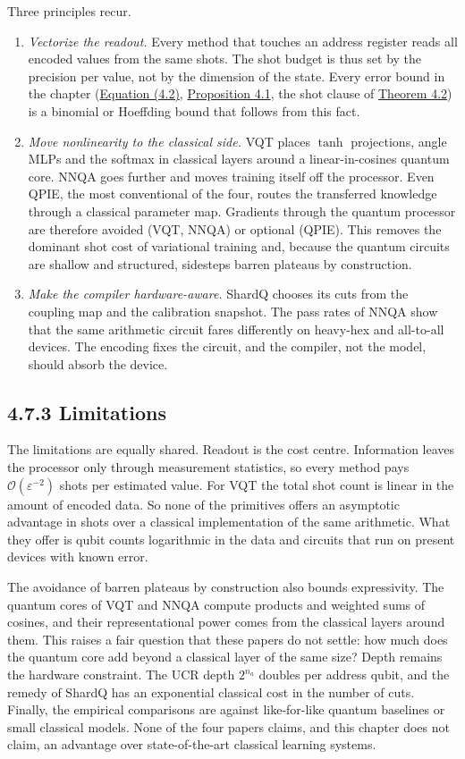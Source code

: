 \documentclass{report}
\theoremstyle{plain}
\theoremstyle{definition}
\theoremstyle{remark}
\newcommand{\bigO}[1]{\mathcal{O}\!\left(#1\right)}
\newcommand{\eps}{\varepsilon}
\begin{document}
Three principles recur.
\begin{enumerate}
\item \emph{Vectorize the readout.} Every method that touches an address register reads all encoded values from the same shots. The shot budget is thus set by the precision per value, not by the dimension of the state. Every error bound in the chapter (\hyperref[eq:qml:readout]{Equation (4.2)}, \hyperref[thm:qml:vqdp-variance]{Proposition 4.1}, the shot clause of \hyperref[thm:qml:nnqa-ua]{Theorem 4.2}) is a binomial or Hoeffding bound that follows from this fact.
\item \emph{Move nonlinearity to the classical side.} VQT places $\tanh$ projections, angle MLPs and the softmax in classical layers around a linear-in-cosines quantum core. NNQA goes further and moves training itself off the processor. Even QPIE, the most conventional of the four, routes the transferred knowledge through a classical parameter map. Gradients through the quantum processor are therefore avoided (VQT, NNQA) or optional (QPIE). This removes the dominant shot cost of variational training and, because the quantum circuits are shallow and structured, sidesteps barren plateaus by construction.
\item \emph{Make the compiler hardware-aware.} ShardQ chooses its cuts from the coupling map and the calibration snapshot. The pass rates of NNQA show that the same arithmetic circuit fares differently on heavy-hex and all-to-all devices. The encoding fixes the circuit, and the compiler, not the model, should absorb the device.
\end{enumerate}

\subsection{4.7.3 Limitations}\label{sec:qml:synthesis:limitations}

The limitations are equally shared. Readout is the cost centre. Information leaves the processor only through measurement statistics, so every method pays $\bigO{\eps^{-2}}$ shots per estimated value. For VQT the total shot count is linear in the amount of encoded data. So none of the primitives offers an asymptotic advantage in shots over a classical implementation of the same arithmetic. What they offer is qubit counts logarithmic in the data and circuits that run on present devices with known error.

The avoidance of barren plateaus by construction also bounds expressivity. The quantum cores of VQT and NNQA compute products and weighted sums of cosines, and their representational power comes from the classical layers around them. This raises a fair question that these papers do not settle: how much does the quantum core add beyond a classical layer of the same size? Depth remains the hardware constraint. The UCR depth $2^{n_a}$ doubles per address qubit, and the remedy of ShardQ has an exponential classical cost in the number of cuts. Finally, the empirical comparisons are against like-for-like quantum baselines or small classical models. None of the four papers claims, and this chapter does not claim, an advantage over state-of-the-art classical learning systems.
\end{document}
